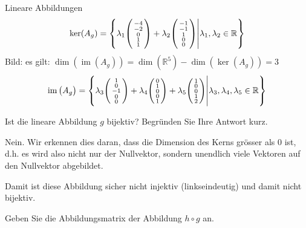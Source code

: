 \begin{example2}[breakable]{Lineare Abbildungen}
$$
\operatorname{ker}(A_g) = \left\{\lambda_1\begin{psmallmatrix}-4 \\ -2 \\ 0 \\ 1 \\ 1\end{psmallmatrix} + \lambda_2\begin{psmallmatrix}-1 \\ -1 \\ 1 \\ 0 \\ 0\end{psmallmatrix} \middle| \lambda_1, \lambda_2 \in \mathbb{R}\right\}
$$
Bild: es gilt: $\operatorname{dim}\left(\operatorname{im}\left(A_{g}\right)\right)=\operatorname{dim}\left(\mathbb{R}^{5}\right)-\operatorname{dim}\left(\operatorname{ker}\left(A_{g}\right)\right)=3$
$$
\operatorname{im}\left(A_{g}\right)=\left\{\lambda_{3}\begin{psmallmatrix}1 \\ 0 \\ -1 \\ 0 \\ 0\end{psmallmatrix}+\lambda_{4}\begin{psmallmatrix}0 \\ 1 \\ 0 \\ 0 \\ 1\end{psmallmatrix}+\lambda_{5}\begin{psmallmatrix}1 \\ 0 \\ 0 \\ 1 \\ 2\end{psmallmatrix} \middle| \lambda_{3}, \lambda_{4}, \lambda_{5} \in \mathbb{R}\right\}
$$

Ist die lineare Abbildung $g$ bijektiv? Begründen Sie Ihre Antwort kurz.

Nein. Wir erkennen dies daran, dass die Dimension des Kerns grösser als 0 ist, d.h. es wird also nicht nur der Nullvektor, sondern unendlich viele Vektoren auf den Nullvektor abgebildet.

Damit ist diese Abbildung sicher nicht injektiv (linkseindeutig) und damit nicht bijektiv.

\vspace{3mm}

Geben Sie die Abbildungsmatrix der Abbildung $h \circ g$ an.


\end{example2}
